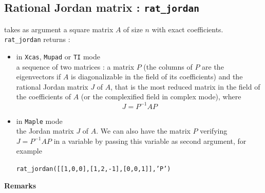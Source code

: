 \documentclass[a4paper,11pt]{book}
\begin{document}
\subsection{Rational Jordan matrix : {\tt rat\_jordan}}
 takes as argument a square
matrix $A$ of size $n$ with exact coefficients.\\
{\tt rat\_jordan} returns :
\begin{itemize}
\item in {\tt Xcas}, {\tt Mupad} or {\tt TI} mode\\ 
a sequence of two matrices : a matrix $P$ (the columns of $P$ are
the eigenvectors if $A$ is diagonalizable in the field of its coefficients)
and the rational Jordan matrix $J$ of $A$, that is the most reduced
matrix in the field of the coefficients of $A$ (or the complexified
field in complex mode), where 
\[ J=P^{-1}AP \]
\item in {\tt Maple} mode\\
the Jordan matrix $J$ of $A$. We can also have the matrix $P$ verifying
$J=P^{-1}AP$ in a variable 
by passing this variable as second argument, for example 
\begin{center} {\tt rat\_jordan([[1,0,0],[1,2,-1],[0,0,1]],'P')}
\end{center}
\end{itemize}
{\bf Remarks}
\end{document}
